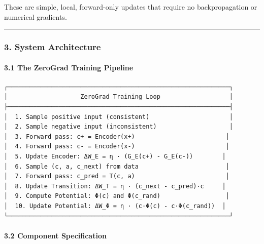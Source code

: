 \documentclass[
  11pt,
  a4paper,
]{article}
\begin{document}
These are simple, local, forward-only updates that require no
backpropagation or numerical gradients.

\begin{center}\rule{0.5\linewidth}{0.5pt}\end{center}

\subsubsection{3. System Architecture}\label{system-architecture}

\paragraph{3.1 The ZeroGrad Training
Pipeline}\label{the-zerograd-training-pipeline}

\begin{verbatim}
┌─────────────────────────────────────────────────────────────┐
│                    ZeroGrad Training Loop                   │
├─────────────────────────────────────────────────────────────┤
│  1. Sample positive input (consistent)                      │
│  2. Sample negative input (inconsistent)                    │
│  3. Forward pass: c+ = Encoder(x+)                         │
│  4. Forward pass: c- = Encoder(x-)                         │
│  5. Update Encoder: ΔW_E = η · (G_E(c+) - G_E(c-))        │
│  6. Sample (c, a, c_next) from data                        │
│  7. Forward pass: c_pred = T(c, a)                         │
│  8. Update Transition: ΔW_T = η · (c_next - c_pred)·c     │
│  9. Compute Potential: Φ(c) and Φ(c_rand)                  │
│  10. Update Potential: ΔW_Φ = η · (c·Φ(c) - c·Φ(c_rand))  │
└─────────────────────────────────────────────────────────────┘
\end{verbatim}

\paragraph{3.2 Component Specification}\label{component-specification}
\end{document}
